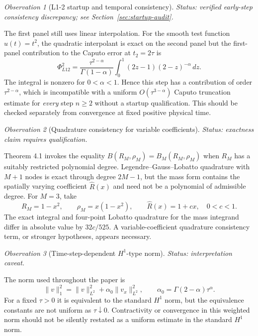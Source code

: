 \documentclass[11pt,a4paper]{amsart}
\theoremstyle{remark}
\newtheorem{observation}{Observation}
\theoremstyle{plain}
\theoremstyle{remark}
\newcommand{\auditstatus}[1]{\par\noindent\emph{#1.}\enspace}
\numberwithin{equation}{section}
\begin{document}
\begin{observation}[L1-2 startup and temporal consistency]
\auditstatus{Status: verified early-step consistency discrepancy; see Section~\ref{sec:startup-audit}}

The first panel still uses linear interpolation. For the smooth test function $u(t)=t^2$, the quadratic interpolant is exact on the second panel but the first-panel contribution to the Caputo error at $t_2=2\tau$ is
\[
 \Phi_{L12}^{2}
 =\frac{\tau^{2-\alpha}}{\Gamma(1-\alpha)}
  \int_0^1(2z-1)(2-z)^{-\alpha}\,dz.
\]
The integral is nonzero for $0<\alpha<1$. Hence this step has a contribution of order $\tau^{2-\alpha}$, which is incompatible with a uniform $O(\tau^{3-\alpha})$ Caputo truncation estimate for \emph{every} step $n\geq2$ without a startup qualification. This should be checked separately from convergence at fixed positive physical time.
\end{observation}

\begin{observation}[Quadrature consistency for variable coefficients]
\auditstatus{Status: exactness claim requires qualification}

Theorem 4.1 invokes the equality $B(R_M,\rho_M)=B_M(R_M,\rho_M)$ when $R_M$ has a suitably restricted polynomial degree. Legendre--Gauss--Lobatto quadrature with $M+1$ nodes is exact through degree $2M-1$, but the mass form contains the spatially varying coefficient $\widehat R(x)$ and need not be a polynomial of admissible degree. For $M=3$, take
\[
 R_M=1-x^2,\qquad \rho_M=x(1-x^2),\qquad \widehat R(x)=1+cx,
 \quad 0<c<1.
\]
The exact integral and four-point Lobatto quadrature for the mass integrand differ in absolute value by $32c/525$. A variable-coefficient quadrature consistency term, or stronger hypotheses, appears necessary.
\end{observation}

\begin{observation}[Time-step-dependent $H^1$-type norm]
\auditstatus{Status: interpretation caveat}

The norm used throughout the paper is
\[
\|v\|_1^2=\|v\|_{L^2}^2+\alpha_0\|v_x\|_{L^2}^2,
\qquad\alpha_0=\Gamma(2-\alpha)\tau^\alpha.
\]
For a fixed $\tau>0$ it is equivalent to the standard $H^1$ norm, but the equivalence constants are not uniform as $\tau\downarrow0$. Contractivity or convergence in this weighted norm should not be silently restated as a uniform estimate in the standard $H^1$ norm.
\end{observation}
\end{document}
